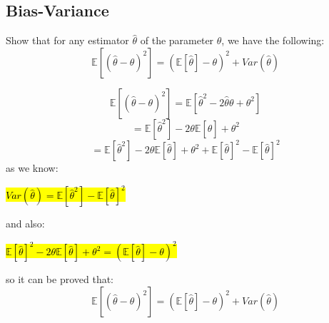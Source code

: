 \subsection{Bias-Variance}
Show that for any estimator $\hat{\theta }$ of the parameter $\theta$, we have the following:
$$\mathbb{E}[(\hat{\theta} - \theta)^2] = (\mathbb{E}[\hat{\theta}] - \theta)^2 + Var(\hat{\theta})$$
\begin{qsolve}
	\begin{qsolve}[]
		$$\mathbb{E}[(\hat{\theta} - \theta)^2] = \mathbb{E}[\hat{\theta}^2 - 2\hat{\theta}\theta + \theta^2] $$
		$$= \mathbb{E}[\hat{\theta}^2] - 2\theta \mathbb{E}[\hat{\theta}] + \theta^2$$
		$$= \mathbb{E}[\hat{\theta}^2] - 2\theta \mathbb{E}[\hat{\theta}] + \theta^2 + \mathbb{E}[\hat{\theta}]^2 - \mathbb{E}[\hat{\theta}]^2$$
	    as we know:
		\begin{center}
			\hl{$Var(\hat{\theta}) = \mathbb{E}[\hat{\theta}^2] - \mathbb{E}[\hat{\theta}]^2$}
		\end{center}
		and also:
		\begin{center}
			\hl{$\mathbb{E}[\hat{\theta}]^2 - 2\theta \mathbb{E}[\hat{\theta}] + \theta^2 = (\mathbb{E}[\hat{\theta}] - \theta)^2$}
		\end{center}
		so it can be proved that:
		$$\mathbb{E}[(\hat{\theta} - \theta)^2] = (\mathbb{E}[\hat{\theta}] - \theta)^2 + Var(\hat{\theta})$$
	\end{qsolve}
\end{qsolve}
